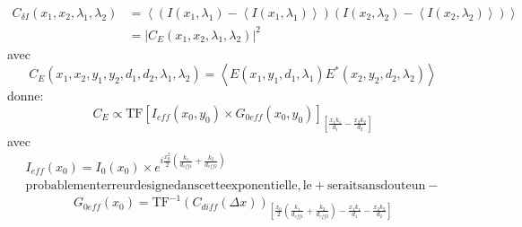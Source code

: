 \begin{equation}
\begin{split}
C _{\delta I} \left( x_1, x_2, \lambda _1, \lambda _2 \right) &= \left\langle \left( I \left( x_1, \lambda _1 \right) - \left\langle I \left( x_1, \lambda _1 \right) \right\rangle \right) \left( I \left( x_2, \lambda _2 \right) - \left\langle I \left( x_2, \lambda _2 \right) \right\rangle \right) \right\rangle \\
&= \left| C_E \left( x_1, x_2, \lambda _1, \lambda _2 \right) \right| ^2
\end{split}
\end{equation}
avec
\begin{equation}
C_E(x_1 ,x_2 ,y_1 ,y_2 ,d_1 ,d_2 ,\lambda _1,\lambda _2)= \left\langle E(x_1 ,y_1 ,d_1 ,\lambda _1) E^*(x_2 ,y_2 ,d_2 ,\lambda _2) \right\rangle
\end{equation}
donne:
\begin{equation}
C_E \propto \mathrm{TF} \left[ I_{eff}(x_0,y_0) \times G_{0eff}(x_0,y_0) \right] _{\left[ \frac{x_1 k_1}{d_1}-\frac{x_2 k_2}{d_2} \right]}
\end{equation}
avec
\begin{equation*}
\begin{split}
I_{eff}(x_0)= I_0(x_0) \times e^{i \frac{x_0^2}{2} \left( \frac{k_1}{d_{eff1}} + \frac{k_2}{d_{eff2}}\right)} \\ 
\mathrm{probablement erreur de signe dans cette exponentielle, le + serait sans doute un -}
\end{split}
\end{equation*}
\begin{equation*}
G_{0eff}(x_0)=\mathrm{TF}^{-1} \left( C_{diff}(\Delta x) \right)_{\left[ \frac{x_0}{2} \left( \frac{k_1}{d_{eff1}} + \frac{k_2}{d_{eff2}} \right) -\frac{x_1 k_1}{d_1} - \frac{x_2 k_2}{d_2}\right]}
\end{equation*}